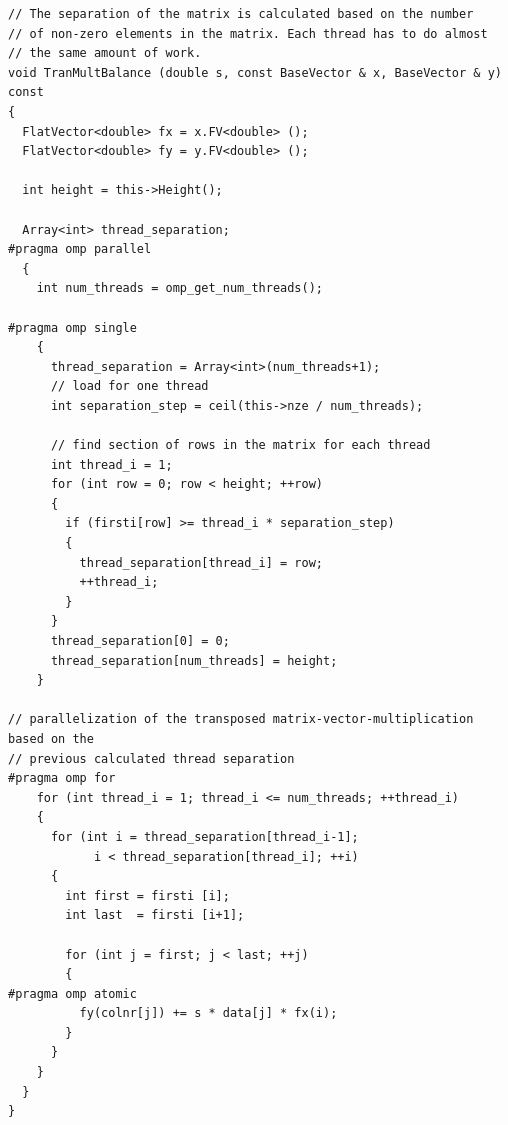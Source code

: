 \documentclass[a4paper,11pt]{scrartcl}
\begin{document}
\begin{lstlisting}
// The separation of the matrix is calculated based on the number
// of non-zero elements in the matrix. Each thread has to do almost
// the same amount of work.
void TranMultBalance (double s, const BaseVector & x, BaseVector & y) const
{
  FlatVector<double> fx = x.FV<double> ();
  FlatVector<double> fy = y.FV<double> ();

  int height = this->Height();

  Array<int> thread_separation;
#pragma omp parallel
  {
    int num_threads = omp_get_num_threads();

#pragma omp single
    {
      thread_separation = Array<int>(num_threads+1);
      // load for one thread
      int separation_step = ceil(this->nze / num_threads);

      // find section of rows in the matrix for each thread
      int thread_i = 1;
      for (int row = 0; row < height; ++row)
      {
        if (firsti[row] >= thread_i * separation_step)
        {
          thread_separation[thread_i] = row;
          ++thread_i;
        }
      }
      thread_separation[0] = 0;
      thread_separation[num_threads] = height;
    }

// parallelization of the transposed matrix-vector-multiplication based on the
// previous calculated thread separation
#pragma omp for
    for (int thread_i = 1; thread_i <= num_threads; ++thread_i)
    {
      for (int i = thread_separation[thread_i-1];
            i < thread_separation[thread_i]; ++i)
      {
        int first = firsti [i];
        int last  = firsti [i+1];

        for (int j = first; j < last; ++j)
        {
#pragma omp atomic
          fy(colnr[j]) += s * data[j] * fx(i);
        }
      }
    }
  }
}

\end{lstlisting}
\end{document}
